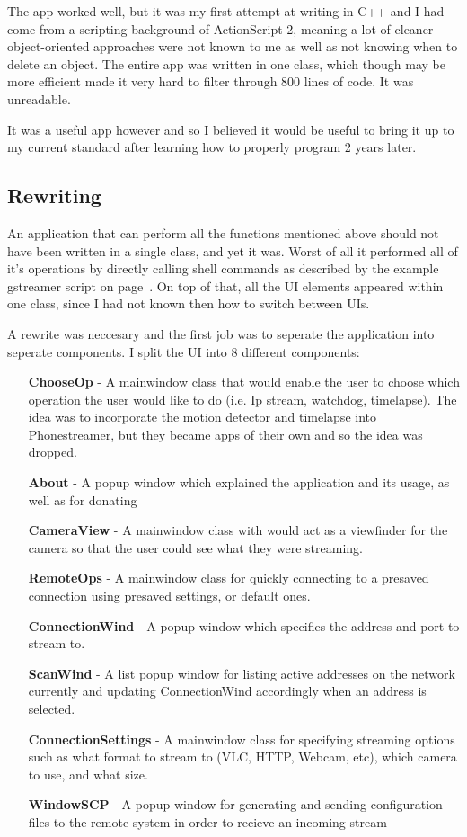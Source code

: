 \documentclass[11pt]{article} %
\begin{document}
The app worked well, but it was my first attempt at writing in C++ and I had come from a scripting background of ActionScript 2, meaning a lot of cleaner object-oriented approaches were not known to me as well as not knowing when to delete an object. The entire app was written in one class, which though may be more efficient made it very hard to filter through 800 lines of code. It was unreadable.

It was a useful app however and so I believed it would be useful to bring it up to my current standard after learning how to properly program 2 years later.

\subsection{Rewriting}

An application that can perform all the functions mentioned above should not have been written in a single class, and yet it was. Worst of all it performed all of it's operations by directly calling shell commands as described by the example gstreamer script on page~\pageref{gstreamer}. On top of that, all the UI elements appeared within one class, since I had not known then how to switch between UIs.

A rewrite was neccesary and the first job was to seperate the application into seperate components. I split the UI into 8 different components:
\begin{enumerate}
\item [\bf ChooseOp] - A mainwindow class that would enable the user to choose which operation the user would like to do (i.e. Ip stream, watchdog, timelapse). The idea was to incorporate the motion detector and timelapse into Phonestreamer, but they became apps of their own and so the idea was dropped.
\item [\bf About] - A popup window which explained the application and its usage, as well as for donating
\item [\bf CameraView] - A mainwindow class with would act as a viewfinder for the camera so that the user could see what they were streaming.
\item [\bf RemoteOps] - A mainwindow class for quickly connecting to a presaved connection using presaved settings, or default ones.
\item [\bf ConnectionWind] - A popup window which specifies the address and port to stream to.
\item [\bf ScanWind] - A list popup window for listing active addresses on the network currently and updating ConnectionWind accordingly when an address is selected.
\item [\bf ConnectionSettings] - A mainwindow class for specifying streaming options such as what format to stream to (VLC, HTTP, Webcam, etc), which camera to use,  and what size.
\item [\bf WindowSCP] - A popup window for generating and sending configuration files to the remote system in order to recieve an incoming stream
\end{enumerate}
\end{document}
